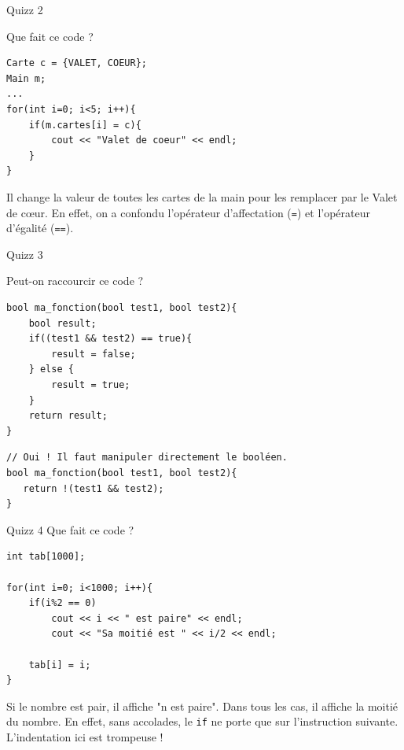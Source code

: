 \begin{frame}[fragile]{Quizz 2}

Que fait ce code ?

\begin{verbatim}
Carte c = {VALET, COEUR};
Main m;
...
for(int i=0; i<5; i++){
    if(m.cartes[i] = c){
        cout << "Valet de coeur" << endl;
    }
}
\end{verbatim}

{Il change la valeur de toutes les cartes de la main pour les remplacer par le Valet de c\oe{}ur. En effet, on a confondu l'opérateur d'affectation (\texttt{=}) et l'opérateur d'égalité (\texttt{==}).}
\end{frame}

\begin{frame}[fragile]{Quizz 3}

Peut-on raccourcir ce code ?

\begin{verbatim}
bool ma_fonction(bool test1, bool test2){
    bool result;
    if((test1 && test2) == true){
        result = false;
    } else {
        result = true;
    }
    return result;
}
\end{verbatim}

\begin{overprint}
{}
\begin{verbatim}
// Oui ! Il faut manipuler directement le booléen.
bool ma_fonction(bool test1, bool test2){
   return !(test1 && test2);
}
\end{verbatim}
\end{overprint}
\end{frame}

\begin{frame}[fragile]{Quizz 4}
Que fait ce code ?

\begin{verbatim}
int tab[1000];

for(int i=0; i<1000; i++){
    if(i%2 == 0)
        cout << i << " est paire" << endl;
        cout << "Sa moitié est " << i/2 << endl;
    
    tab[i] = i;
}
\end{verbatim}

{Si le nombre est pair, il affiche "n est paire". Dans tous les cas, il affiche la moitié du nombre. En effet, sans accolades, le \texttt{if} ne porte que sur l'instruction suivante. L'indentation ici est trompeuse !}
\end{frame}

